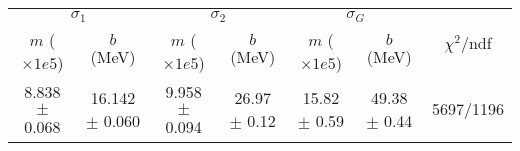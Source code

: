\begin{tabular}{cc|cc|cc||c}
\multicolumn{2}{c|}{$\sigma_1$} & \multicolumn{2}{|c}{$\sigma_2$} & \multicolumn{2}{|c}{$\sigma_G$}  & \multirow{2}{*}{$\chi^2/$ndf}\\
$m$ ($\times1e5$) & $b$ (MeV) & $m$ ($\times1e5$) & $b$ (MeV) & $m$ ($\times1e5$) & $b$ (MeV) & \\
\hline
8.838 $\pm$ 0.068 & 16.142 $\pm$ 0.060 & 9.958 $\pm$ 0.094 & 26.97 $\pm$ 0.12 & 15.82 $\pm$ 0.59 & 49.38 $\pm$ 0.44 & 5697/1196\\
\end{tabular}
